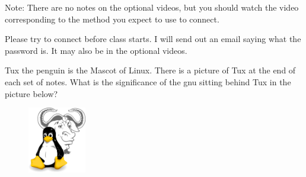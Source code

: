 \documentclass[letterpaper,12pt]{exam}
\begin{document}
\begin{questions}
Note:  There are no notes on the optional videos, but you should watch the video corresponding to the method you expect to use to connect.

Please try to connect before class starts.  I will send out an email saying what the password is.  It may also be in the optional videos.

\question  Tux the penguin is the Mascot of Linux.  There is a picture of Tux at the end of each set of notes.  What is the significance of the gnu sitting behind Tux in the picture below?
\vspace{1.5cm}

\end{questions}
\begin{figure}[b]\label{end}
	\center
	\includegraphics[width=1in]{tux}
	{}
\end{figure}
\end{document}
